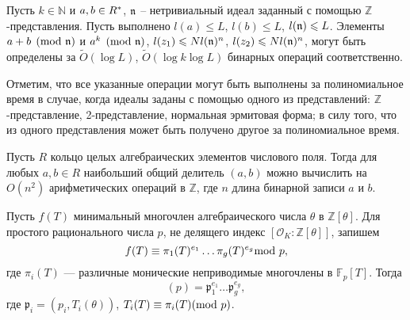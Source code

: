\documentclass[_00_dissertation.tex]{subfiles}
\begin{document}
\begin{corollary}
    Пусть $k \in \mathbb{N}$ и $a, b \in R^{*}$, $\mathfrak{n}$ -- нетривиальный идеал заданный с помощью $\mathbb{Z}$-представления.
    Пусть выполнено $l(a) \leq L$, $l(b) \leq L$, $l(\mathfrak{n}) \leqslant L$.
    Элементы $a + b \pmod{\mathfrak{n}}$ и $a^k \pmod{\mathfrak{n}}$, $l(z_1) \leqslant N l(\mathfrak{n})^n$, $l(z_2) \leqslant N l(\mathfrak{n})^n$, могут быть определены за $\tilde{O}(\log L)$, $\tilde{O}(\log k \log L)$  бинарных операций соответственно.
\end{corollary}

\begin{remark}
    Отметим, что все указанные операции могут быть выполнены за полиномиальное время в случае, когда идеалы заданы с помощью одного из представлений: $\mathbb{Z}$-представление, 2-представление, нормальная эрмитовая форма; в силу того, что из одного представления может быть получено другое за полиномиальное время.
\end{remark}

\begin{statement}\cite{source:Wikstrom}
    Пусть $R$ кольцо целых алгебраических элементов числового поля.
    Тогда для любых $a, b \in R$ наибольший общий делитель $(a, b)$ можно вычислить на $O(n^2)$ арифметических операций в $\mathbb{Z}$, где $n$ длина бинарной записи $a$ и $b$.
\end{statement}

\begin{statement}\label{statement:dedekind}
    Пусть $f(T)$ минимальный многочлен алгебраического числа $\theta$ в $\mathbb{Z}[\theta]$.
    Для простого рационального числа $p$, не делящего индекс $[\mathcal{O}_K:\mathbb{Z}[\theta]]$, запишем
    \begin{equation}
        f(T) \equiv \pi_1(T)^{e_1}\dots \pi_g(T)^{e_g} \textrm{mod } p,\nonumber
    \end{equation}
    где $\pi_i(T)$ --- различные монические неприводимые многочлены в $\mathbb{F}_p[T]$.
    Тогда
    \begin{equation}
        (p) = \mathfrak{p}_1^{e_1}\dots \mathfrak{p}_g^{e_g},\nonumber
    \end{equation}
    где $\mathfrak{p}_i = (p_i, T_i(\theta))$, $T_i(T) \equiv \pi_i(T)(\textrm{mod } p)$.
\end{statement}
\end{document}
